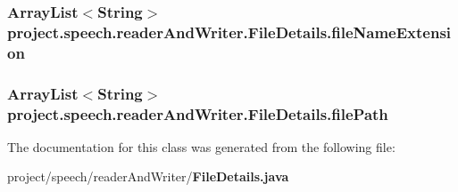 \subsubsection[{file\+Name\+Extension}]{\setlength{\rightskip}{0pt plus 5cm}Array\+List$<$String$>$ project.\+speech.\+reader\+And\+Writer.\+File\+Details.\+file\+Name\+Extension\hspace{0.3cm}{\ttfamily [private]}}\label{classproject_1_1speech_1_1reader_and_writer_1_1_file_details_af02abf09e6d2185543f5cab8f187429e}
\subsubsection[{file\+Path}]{\setlength{\rightskip}{0pt plus 5cm}Array\+List$<$String$>$ project.\+speech.\+reader\+And\+Writer.\+File\+Details.\+file\+Path\hspace{0.3cm}{\ttfamily [private]}}\label{classproject_1_1speech_1_1reader_and_writer_1_1_file_details_a074175e36443bda8f3017e4df5038bcc}


The documentation for this class was generated from the following file\+:\begin{DoxyCompactItemize}
\item 
project/speech/reader\+And\+Writer/{\bf File\+Details.\+java}\end{DoxyCompactItemize}
